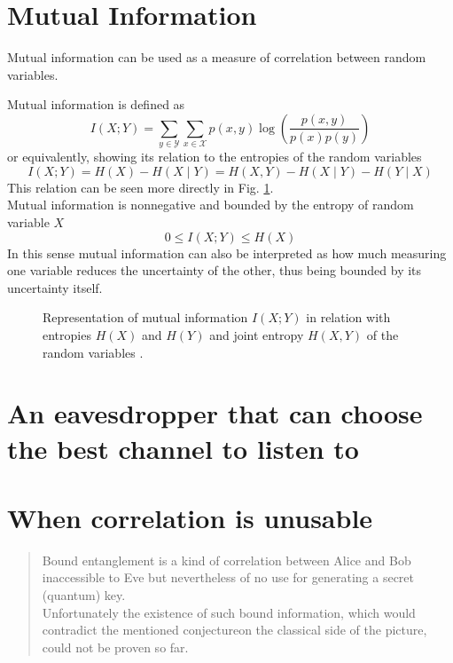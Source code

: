\section{Mutual Information}
    Mutual information can be used as a measure of correlation between random variables. 
	
	Mutual information is defined as
	$$ I(X;Y) = \sum_{y\in\mathcal{Y}}\sum_{x\in\mathcal{X}} p(x,y) \log\left(\frac{p(x,y)}{p(x)p(y)}\right) $$
	or equivalently, showing its relation to the entropies of the random variables
	$$ I(X;Y) = H(X) - H(X\mid Y) = H(X,Y) - H(X\mid Y) - H(Y\mid X) $$
	This relation can be seen more directly in Fig. \ref{fig:mutual_info}.\\
	Mutual information is nonnegative and bounded by the entropy of random variable $X$
	$$ 0 \leq I(X;Y) \leq H(X) $$
	In this sense mutual information can also be interpreted as how much measuring one variable reduces the uncertainty of the other, thus being bounded by its uncertainty itself.
	
	\begin{figure}[h]
		\centering
		
		\caption{Representation of mutual information $I(X;Y)$ in relation with entropies $H(X)$ and $H(Y)$ and joint entropy $H(X,Y)$ of the random variables .
		\label{fig:mutual_info}}
	\end{figure}	
\section{An eavesdropper that can choose the best channel to listen to}
\section{When correlation is unusable}
	\begin{quotation}
		Bound entanglement is a kind of correlation between Alice and Bob inaccessible to Eve but nevertheless of no use for generating a secret (quantum) key.\\
		Unfortunately the existence of such bound information, which would contradict the mentioned conjecture\footnotemark on the classical side of the picture, could not be proven so far.
	\end{quotation}
		
